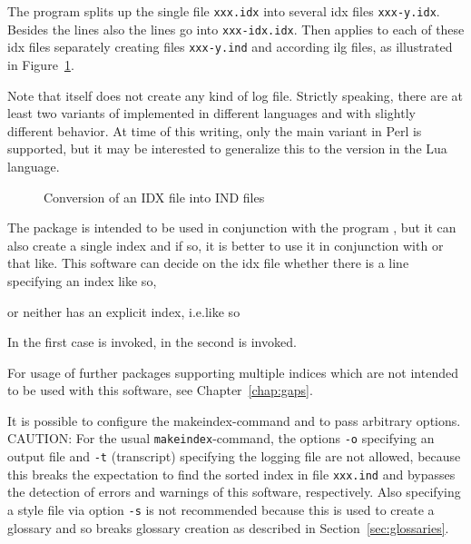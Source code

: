 The program  splits up the single file \texttt{xxx.idx} 
into several \gls{idx} files \texttt{xxx-y.idx}. 
Besides the lines  
also the lines  go into \texttt{xxx-idx.idx}. 
Then  applies  to each of these \gls{idx} files separately 
creating files \texttt{xxx-y.ind} and according \gls{ilg} files, 
as illustrated in Figure~\ref{fig:idx2indSplit}. 

Note that  itself does not create any kind of log file. 
Strictly speaking, there are at least two variants of  
implemented in different languages and with slightly different behavior. 
At time of this writing, only the main variant in Perl is supported, 
but it may be interested to generalize this to the version in the Lua language. 

\begin{figure}[htb]
  \centering
  \caption{\label{fig:idx2indSplit}Conversion of an IDX file into IND files}
  \end{figure}
  \medskip




The package  is intended to be used 
in conjunction with the program , 
but it can also create a single index and if so, it is better to use it in conjunction with 
 or that like. 
This software can decide on the \gls{idx} file whether there is a line specifying an index like so, 
%
\begin{taglstlisting}[language=TeX]
\end{taglstlisting}
%
or neither has an explicit index, i.e.\@ like so 
%
\begin{taglstlisting}[language=TeX]
\end{taglstlisting}
%
In the first case  is invoked, in the second  is invoked. 
\medskip


For usage of further packages supporting multiple indices 
which are not intended to be used with this software, 
see Chapter~\ref{chap:gaps}. 


It is possible to configure the makeindex-command 
and to pass arbitrary options. 
CAUTION\@: For the usual \texttt{makeindex}-command, 
the options \texttt{-o} specifying an output file 
and \texttt{-t} (transcript) specifying the logging file are not allowed, 
because this breaks the expectation to find the sorted index 
in file \texttt{xxx.ind} 
and bypasses the detection of errors and warnings of this software, 
respectively. 
Also specifying a style file via option \texttt{-s} 
is not recommended because this is used to create a glossary 
and so breaks glossary creation 
as described in Section~\ref{sec:glossaries}. 

